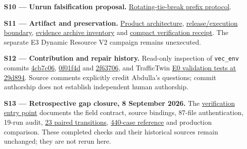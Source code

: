 \documentclass[11pt,a4paper]{article}
\begin{document}
\label{source-s10}

\textbf{S10 --- Unrun falsification proposal.} \href{\detokenize{../../evaluation/common_target_mechanism_audit_2026-09-07/TIEBREAK_PREFIX_PROPOSAL.md}}{Rotating-tie-break prefix protocol}.

\label{source-s11}

\textbf{S11 --- Artifact and preservation.} \href{\detokenize{../../architecture_current_release.md}}{Product architecture}, \href{\detokenize{../../quality/final_release_status_20260815.md}}{release/execution boundary}, \href{\detokenize{../../evaluation/vec_followup_2026-09-07/ARCHIVE_INVENTORY.json}}{evidence archive inventory} and \href{\detokenize{../../evaluation/vec_followup_2026-09-07/COMPACT_VERIFICATION.json}}{compact verification receipt}. The separate E3 Dynamic Resource V2 campaign remains unexecuted.

\label{source-s12}

\textbf{S12 --- Contribution and repair history.} Read-only inspection of \texttt{vec\_env} commits \href{\detokenize{https://github.com/Abdulla4akash/vec_env/commit/4cb7c06aab1b455d68f71ea9143172463784dea9}}{4cb7c06}, \href{\detokenize{https://github.com/Abdulla4akash/vec_env/commit/0f01f4d2082d3e8b735e74a873095ab8eeba37cc}}{0f01f4d} and \href{\detokenize{https://github.com/Abdulla4akash/vec_env/commit/2f63706f46319433a2ba3af1df97afd0e56a95d1}}{2f63706}, and TrafficTwin \href{\detokenize{https://github.com/Abdulla4akash/traffictwin/blob/29d8945862b7df1bd5d7879ba1d980a388f6be0d/tests/test_validate_e0_smoke.py}}{E0 validation tests at 29d894}. Source comments explicitly credit Abdulla's questions; commit authorship does not establish independent human authorship.

\label{source-s13}

\textbf{S13 --- Retrospective gap closure, 8 September 2026.} The \href{\detokenize{../gap_closure_2026-09-08/verification/README.md}}{verification entry point} documents the field contract, source bindings, 87-file authentication, 19-run audit, \href{\detokenize{../gap_closure_2026-09-08/verification/results/OUTCOME_TRANSITIONS.json}}{23 paired transitions}, \href{\detokenize{../gap_closure_2026-09-08/verification/results/KERNEL_RESULTS.json}}{440-case reference} and production comparison. These completed checks and their historical sources remain unchanged; they are not rerun here.
\end{document}
